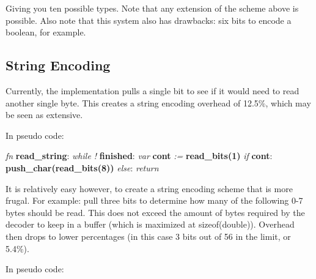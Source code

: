 Giving you ten possible types. Note that any extension of the scheme
above is possible. Also note that this system also has drawbacks:
six bits to encode a boolean, for example.

\subsection{String Encoding}

Currently, the implementation pulls a single bit to see if it would need
to read another single byte. This creates a string encoding overhead of
12.5\%, which may be seen as extensive.

In pseudo code:

\begin{changemargin}{-60mm}{0mm}
\begin{myquote}

\vbox{
\textit{fn} \textbf{read\_string}: \newline
\indent\hspace{.5cm} \textit{while !} \textbf{finished}: \newline
\indent\hspace{1cm} \textit{var} \textbf{cont} \textit{:=} \textbf{read\_bits(1)} \newline
\indent\hspace{1cm} \textit{if} \textbf{cont}: \newline
\indent\hspace{1.5cm} \textbf{push\_char(read\_bits(8))} \newline
\indent\hspace{1cm} \textit{else}: \newline
\indent\hspace{1.5cm} \textit{return} \newline
}

\end{myquote}
\end{changemargin}

It is relatively easy however, to create a string encoding scheme that
is more frugal. For example: pull three bits to determine how many of the
following 0-7 bytes should be read. This does not exceed the amount of
bytes required by the decoder to keep in a buffer (which is maximized at
sizeof(double)). Overhead then drops to lower percentages
(in this case 3 bits out of 56 in the limit, or 5.4\%).

In pseudo code:

